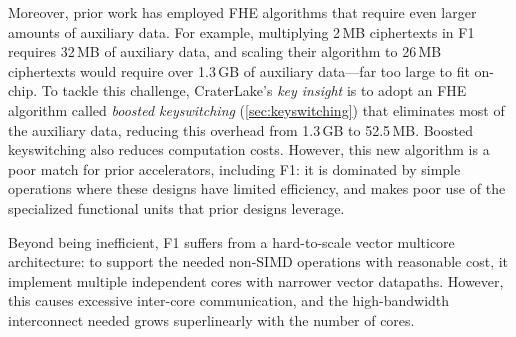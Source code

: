 Moreover, prior work has employed FHE algorithms that require even larger
amounts of auxiliary data. For example, multiplying 2\,MB ciphertexts in F1
requires 32\,MB of auxiliary data, and scaling their algorithm to 26\,MB
ciphertexts would require over 1.3\,GB of auxiliary data---far too large to fit
on-chip. To tackle this challenge, CraterLake's \emph{key insight} is to adopt
an FHE algorithm called \emph{boosted keyswitching}
(\autoref{sec:keyswitching}) that eliminates most of the auxiliary data,
reducing this overhead from 1.3\,GB to 52.5\,MB. Boosted keyswitching also
reduces computation costs. However, this new algorithm is a poor match for
prior accelerators, including F1: it is dominated by simple operations where
these designs have limited efficiency, and makes poor use of the specialized
functional units that prior designs leverage.

Beyond being inefficient, F1 suffers from a hard-to-scale vector multicore
architecture: to support the needed non-SIMD operations with reasonable cost,
it implement multiple independent cores with narrower vector datapaths.
However, this causes excessive inter-core communication, and the high-bandwidth
interconnect needed grows superlinearly with the number of cores.

